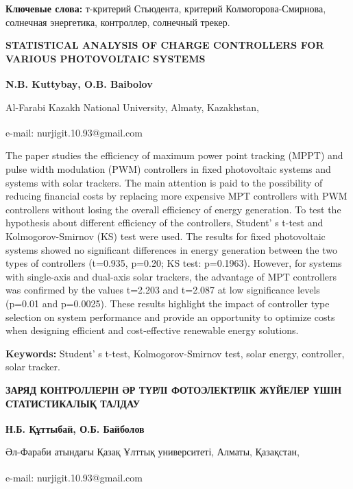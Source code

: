 {\bfseries Ключевые слова:} т-критерий Стьюдента, критерий
Колмогорова-Смирнова, солнечная энергетика, контроллер, солнечный
трекер.

\begin{articleheader}
{\bfseries STATISTICAL ANALYSIS OF CHARGE CONTROLLERS FOR VARIOUS
PHOTOVOLTAIC SYSTEMS}

{\bfseries
N.B. Kuttybay\textsuperscript{\envelope },
O.B. Baibolov
}
\end{articleheader}

\begin{affiliation}
Al-Farabi Kazakh National University, Almaty, Kazakhstan,

\textsuperscript{\envelope }e-mail: nurjigit.10.93@gmail.com
\end{affiliation}

The paper studies the efficiency of maximum power point tracking (MPPT)
and pulse width modulation (PWM) controllers in fixed photovoltaic
systems and systems with solar trackers. The main attention is paid to
the possibility of reducing financial costs by replacing more expensive
MPT controllers with PWM controllers without losing the overall
efficiency of energy generation. To test the hypothesis about different
efficiency of the controllers, Student' s t-test and
Kolmogorov-Smirnov (KS) test were used. The results for fixed
photovoltaic systems showed no significant differences in energy
generation between the two types of controllers (t=0.935, p=0.20; KS
test: p=0.1963). However, for systems with single-axis and dual-axis
solar trackers, the advantage of MPT controllers was confirmed by the
values \hspace{0pt}\hspace{0pt}t=2.203 and t=2.087 at low significance
levels (p=0.01 and p=0.0025). These results highlight the impact of
controller type selection on system performance and provide an
opportunity to optimize costs when designing efficient and
cost-effective renewable energy solutions.

{\bfseries Keywords:} Student' s t-test, Kolmogorov-Smirnov
test, solar energy, controller, solar tracker.

\begin{articleheader}
{\bfseries ЗАРЯД КОНТРОЛЛЕРІН ӘР ТҮРЛІ ФОТОЭЛЕКТРЛІК ЖҮЙЕЛЕР ҮШІН
СТАТИСТИКАЛЫҚ ТАЛДАУ}

{\bfseries
Н.Б. Құттыбай\textsuperscript{\envelope },
О.Б. Байболов}
\end{articleheader}

\begin{affiliation}
Әл-Фараби атындағы Қазақ Ұлттық университеті, Алматы, Қазақстан,

\textsuperscript{\envelope }e-mail: nurjigit.10.93@gmail.com
\end{affiliation}

